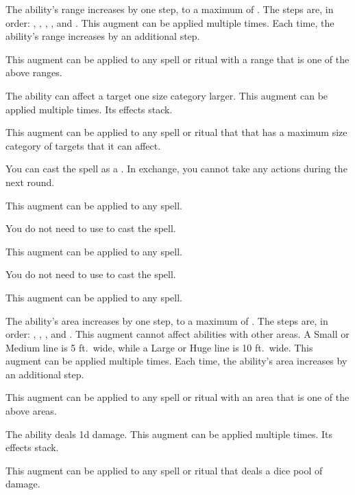              The ability's range increases by one step, to a maximum of \rngext.
            The steps are, in order: \rngtouch, \rngclose, \rngmed, \rnglong, and \rngext.
            This augment can be applied multiple times.
            Each time, the ability's range increases by an additional step.
            \par This augment can be applied to any spell or ritual with a range that is one of the above ranges.

             The ability can affect a target one size category larger.
            This augment can be applied multiple times.
            Its effects stack.
            \par This augment can be applied to any spell or ritual that that has a maximum size category of targets that it can affect.

             You can cast the spell as a .
            In exchange, you cannot take any actions during the next round.
            \par This augment can be applied to any spell.

             You do not need to use  to cast the spell.
            \par This augment can be applied to any spell.

             You do not need to use  to cast the spell.
            \par This augment can be applied to any spell.

             The ability's area increases by one step, to a maximum of \areahuge.
            The steps are, in order: \areasmall, \areamed, \arealarge, and \areahuge.
            This augment cannot affect abilities with other areas.
            A Small or Medium line is 5 ft.\ wide, while a Large or Huge line is 10 ft.\ wide.
            This augment can be applied multiple times.
            Each time, the ability's area increases by an additional step.
            \par This augment can be applied to any spell or ritual with an area that is one of the above areas.

             The ability deals \plus1d damage.
            This augment can be applied multiple times.
            Its effects stack.
            \par This augment can be applied to any spell or ritual that deals a dice pool of damage.

